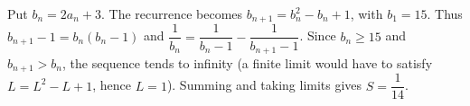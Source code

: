 Put $b_n=2a_n+3$. The recurrence becomes $b_{n+1}=b_n^2-b_n+1$, with $b_1=15$. Thus $b_{n+1}-1=b_n(b_n-1)$ and $\dfrac{1}{b_n}=\dfrac{1}{b_n-1}-\dfrac{1}{b_{n+1}-1}$. Since $b_n\ge15$ and $b_{n+1}>b_n$, the sequence tends to infinity (a finite limit would have to satisfy $L=L^2-L+1$, hence $L=1$). Summing and taking limits gives $\boxed{S=\dfrac{1}{14}}$.
